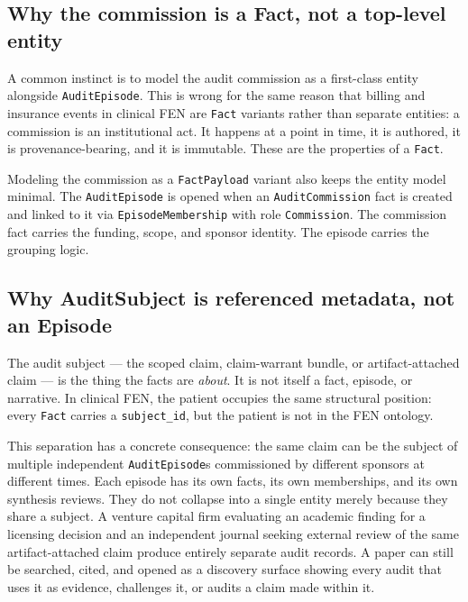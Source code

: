 \documentclass[11pt]{article}
\begin{document}
\subsection{Why the commission is a Fact, not a top-level entity}
\label{sec:commission-rationale}

A common instinct is to model the audit commission as a first-class entity
alongside \texttt{AuditEpisode}. This is wrong for the same reason that
billing and insurance events in clinical FEN are \texttt{Fact} variants rather
than separate entities: a commission is an institutional act. It happens at a
point in time, it is authored, it is provenance-bearing, and it is immutable.
These are the properties of a \texttt{Fact}.

Modeling the commission as a \texttt{FactPayload} variant also keeps the entity
model minimal. The \texttt{AuditEpisode} is opened when an
\texttt{AuditCommission} fact is created and linked to it via
\texttt{EpisodeMembership} with role \texttt{Commission}. The commission fact
carries the funding, scope, and sponsor identity. The episode carries the
grouping logic.

\subsection{Why AuditSubject is referenced metadata, not an Episode}
\label{sec:subject-rationale}

The audit subject --- the scoped claim, claim-warrant bundle, or
artifact-attached claim --- is the thing the facts are \emph{about}. It is not
itself a fact, episode, or narrative. In clinical FEN, the patient occupies the
same structural position: every \texttt{Fact} carries a \texttt{subject\_id},
but the patient is not in the FEN ontology.

This separation has a concrete consequence: the same claim can be the subject of
multiple independent \texttt{AuditEpisode}s commissioned by different sponsors
at different times. Each episode has its own facts, its own memberships, and
its own synthesis reviews. They do not collapse into a single entity merely
because they share a subject. A venture capital firm evaluating an academic
finding for a licensing decision and an independent journal seeking external
review of the same artifact-attached claim produce entirely separate audit
records. A paper can still be searched, cited, and opened as a discovery
surface showing every audit that uses it as evidence, challenges it, or audits a
claim made within it.
\end{document}
